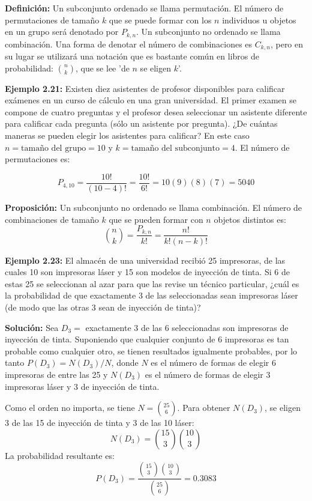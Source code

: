 \documentclass[a4paper]{article}
\begin{document}
\textbf{Definición:}
Un subconjunto ordenado se llama permutación. El número de permutaciones de tamaño $k$ que se puede formar con los $n$ individuos u objetos en un grupo será denotado por $P_{k,n}$. Un subconjunto no ordenado se llama combinación. Una forma de denotar el número de combinaciones es $C_{k,n}$, pero en su lugar se utilizará una notación que es bastante común en libros de probabilidad: $\binom{n}{k}$, que se lee 'de $n$ se eligen $k$'.

\textbf{Ejemplo 2.21:}
Existen diez asistentes de profesor disponibles para calificar exámenes en un curso de cálculo en una gran universidad. El primer examen se compone de cuatro preguntas y el profesor desea seleccionar un asistente diferente para calificar cada pregunta (sólo un asistente por pregunta). ¿De cuántas maneras se pueden elegir los asistentes para calificar? En este caso $n = \text{tamaño del grupo} = 10$ y $k = \text{tamaño del subconjunto} = 4$. El número de permutaciones es:

$$ P_{4,10} = \frac{10!}{(10 - 4)!} = \frac{10!}{6!} = 10(9)(8)(7) = 5040 $$



\textbf{Proposición:}
Un subconjunto no ordenado se llama combinación.  El número de combinaciones de tamaño $k$ que se pueden formar con $n$ objetos distintos es:
$$ \binom{n}{k} = \frac{P_{k,n}}{k!} = \frac{n!}{k!(n-k)!} $$ 

\textbf{Ejemplo 2.23:}
El almacén de una universidad recibió 25 impresoras, de las cuales 10 son impresoras láser y 15 son modelos de inyección de tinta.  Si 6 de estas 25 se seleccionan al azar para que las revise un técnico particular, ¿cuál es la probabilidad de que exactamente 3 de las seleccionadas sean impresoras láser (de modo que las otras 3 sean de inyección de tinta)? 

\textbf{Solución:}
Sea $D_3 =$ {exactamente 3 de las 6 seleccionadas son impresoras de inyección de tinta}.  Suponiendo que cualquier conjunto de 6 impresoras es tan probable como cualquier otro, se tienen resultados igualmente probables, por lo tanto $P(D_3) = N(D_3)/N$, donde $N$ es el número de formas de elegir 6 impresoras de entre las 25 y $N(D_3)$ es el número de formas de elegir 3 impresoras láser y 3 de inyección de tinta. 

Como el orden no importa, se tiene $N = \binom{25}{6}$. Para obtener $N(D_3)$, se eligen 3 de las 15 de inyección de tinta y 3 de las 10 láser:
$$ N(D_3) = \binom{15}{3} \binom{10}{3} $$ 
La probabilidad resultante es:
$$ P(D_3) = \frac{\binom{15}{3} \binom{10}{3}}{\binom{25}{6}} = 0.3083 $$ 
\end{document}
